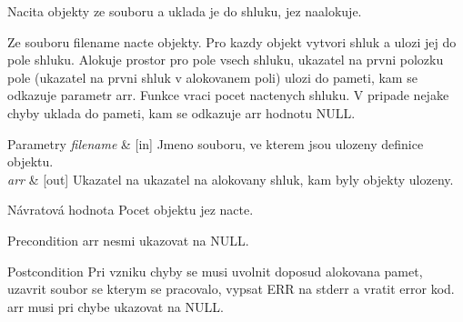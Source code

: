 Nacita objekty ze souboru a uklada je do shluku, jez naalokuje. 

Ze souboru \textquotesingle{}filename\textquotesingle{} nacte objekty. Pro kazdy objekt vytvori shluk a ulozi jej do pole shluku. Alokuje prostor pro pole vsech shluku, ukazatel na prvni polozku pole (ukazatel na prvni shluk v alokovanem poli) ulozi do pameti, kam se odkazuje parametr \textquotesingle{}arr\textquotesingle{}. Funkce vraci pocet nactenych shluku. V pripade nejake chyby uklada do pameti, kam se odkazuje \textquotesingle{}arr\textquotesingle{} hodnotu N\+U\+LL.


\begin{DoxyParams}{Parametry}
{\em filename} & \mbox{[}in\mbox{]} Jmeno souboru, ve kterem jsou ulozeny definice objektu. \\
\hline
{\em arr} & \mbox{[}out\mbox{]} Ukazatel na ukazatel na alokovany shluk, kam byly objekty ulozeny. \\
\hline
\end{DoxyParams}
\begin{DoxyReturn}{Návratová hodnota}
Pocet objektu jez nacte.
\end{DoxyReturn}
\begin{DoxyPrecond}{Precondition}
\textquotesingle{}arr\textquotesingle{} nesmi ukazovat na \textquotesingle{}N\+U\+LL\textquotesingle{}. 
\end{DoxyPrecond}
\begin{DoxyPostcond}{Postcondition}
Pri vzniku chyby se musi uvolnit doposud alokovana pamet, uzavrit soubor se kterym se pracovalo, vypsat E\+RR na stderr a vratit error kod. \textquotesingle{}arr\textquotesingle{} musi pri chybe ukazovat na \textquotesingle{}N\+U\+LL\textquotesingle{}. 
\end{DoxyPostcond}
